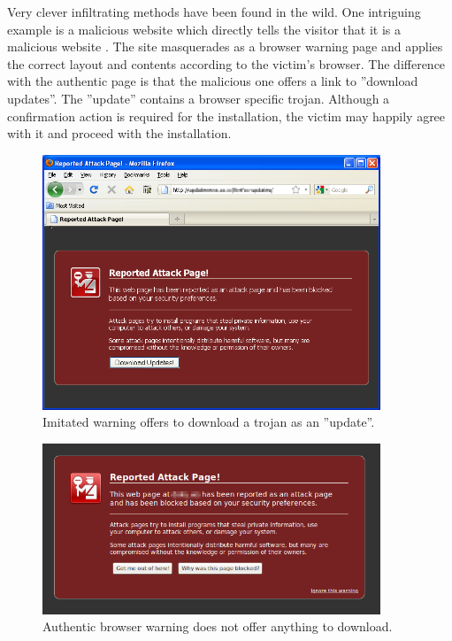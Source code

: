 \documentclass[english,gradu]{tktltiki}
\begin{document}
              Very clever infiltrating methods have been found in the wild. One intriguing example is a malicious website which directly tells the visitor that it is a malicious website \cite{fsecure_webtrojan_2010}. The site masquerades as a browser warning page and applies the correct layout and contents according to the victim's browser. The difference with the authentic page is that the malicious one offers a link to ''download updates''. The ''update'' contains a browser specific trojan. Although a confirmation action is required for the installation, the victim may happily agree with it and proceed with the installation.


            \begin{figure}
              \centering
              \includegraphics[width=0.9\textwidth]{images/firefox_reported_attack_page_trojan.png}
              \caption{Imitated warning offers to download a trojan as an ''update''.}

              \label{fig:ff_malicious_warning}
            \end{figure}

            \begin{figure}
              \centering
              \includegraphics[width=0.9\textwidth]{images/firefox_reported_attack_page_authentic.png}
              \caption{Authentic browser warning does not offer anything to download.}

              \label{fig:ff_authentic_warning}
            \end{figure}
\end{document}
